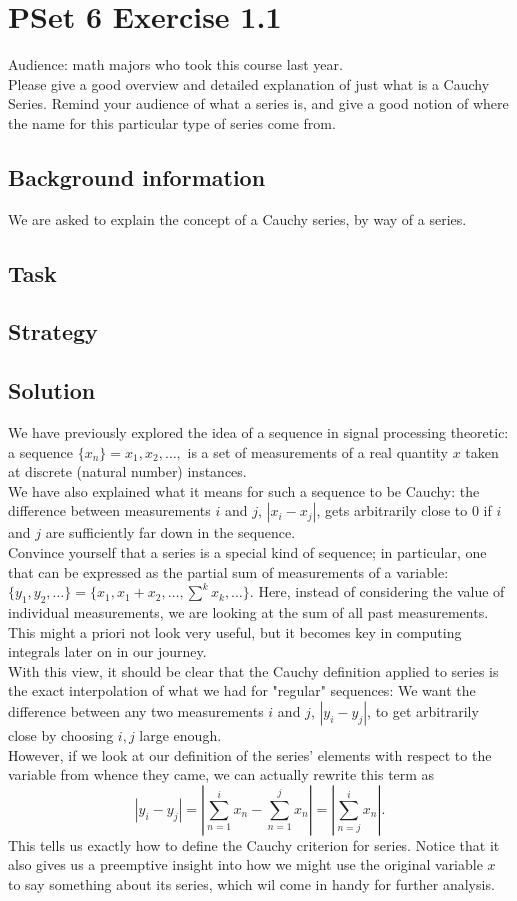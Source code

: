 \documentclass[11 pt]{article}
\begin{document}
\section{PSet 6 Exercise 1.1}
Audience: math majors who took this course last year.\\
Please give a good overview and detailed explanation of just what is a Cauchy Series. Remind your audience of what a series is, and give a good notion of where the name for this particular type of series come from.
\begin{multicols*}{2} 
\subsection{Background information}
We are asked to explain the concept of a Cauchy series, by way of a series.
\subsection{Task}
\subsection{Strategy}
\columnbreak
\subsection{Solution}
	We have previously explored the idea of a sequence in signal processing theoretic: a sequence $\{x_n\}={x_1,x_2,\dots,}$ is a set of measurements of a real quantity $x$ taken at discrete (natural number) instances.\\
	We have also explained what it means for such a sequence to be Cauchy: the difference between measurements $i$ and $j$, $|x_i-x_j|$, gets arbitrarily close to 0 if $i$ and $j$ are sufficiently far down in the sequence.\\
	Convince yourself that a series is a special kind of sequence; in particular, one that can be expressed as the partial sum of measurements of a variable: $\{y_1, y_2,\dots\}=\{x_1, x_1+x_2,\dots,\sum^{k}x_k,\dots\}$. Here, instead of considering the value of individual measurements, we are looking at the sum of all past measurements. This might a priori not look very useful, but it becomes key in computing integrals later on in our journey.\\
	With this view, it should be clear that the Cauchy definition applied to series is the exact interpolation of what we had for "regular" sequences:
	We want the difference between any two measurements $i$ and $j$, $|y_i-y_j|$, to get arbitrarily close by choosing $i,j$ large enough.\\
	However, if we look at our definition of the series' elements with respect to the variable from whence they came, we can actually rewrite this term as \[
		|y_i-y_j|=|\sum_{n=1}^{i}x_n-\sum_{n=1}^{j}x_n|=|\sum_{n=j}^{i}x_n|
	.\] 
	This tells us exactly how to define the Cauchy criterion for series. Notice that it also gives us a preemptive insight into how we might use the original variable $x$ to say something about its series, which wil come in handy for further analysis.
\end{multicols*}
\
\end{document}
